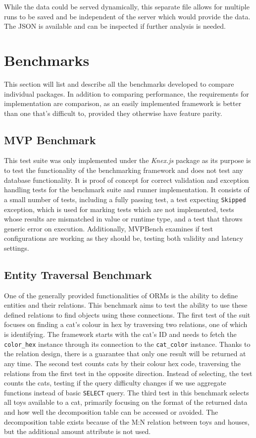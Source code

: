While the data could be served dynamically, this separate file allows for
multiple runs to be saved and be independent of the server which would provide
the data. The JSON is available and can be inspected if further analysis is
needed.

\section{Benchmarks}
This section will list and describe all the benchmarks developed to compare
individual packages. In addition to comparing performance, the requirements for
implementation are comparison, as an easily implemented framework is better than
one that's difficult to, provided they otherwise have feature parity.

\subsection*{MVP Benchmark}
This test suite was only implemented under the \textit{Knex.js} package as its
purpose is to test the functionality of the benchmarking framework and does not
test any database functionality. It is proof of concept for correct validation
and exception handling tests for the benchmark suite and runner implementation.
It consists of a small number of tests, including a fully passing test, a test
expecting \texttt{Skipped} exception, which is used for marking tests which are
not implemented, tests whose results are mismatched in value or runtime type,
and a test that throws generic error on execution. Additionally, MVPBench
examines if test configurations are working as they should be, testing both
validity and latency settings.

\subsection*{Entity Traversal Benchmark}
One of the generally provided functionalities of ORMs is the ability to define
entities and their relations. This benchmark aims to test the ability to use
these defined relations to find objects using these connections. The first test
of the suit focuses on finding a cat's colour in hex by traversing two
relations, one of which is identifying. The framework starts with the cat's ID
and needs to fetch the \texttt{color\_hex} instance through its connection to
the \texttt{cat\_color} instance. Thanks to the relation design, there is a
guarantee that only one result will be returned at any time. The second test
counts cats by their colour hex code, traversing the relations from the first
test in the opposite direction. Instead of selecting, the test counts the cats,
testing if the query difficulty changes if we use aggregate functions instead of
basic \texttt{SELECT} query. The third test in this benchmark selects all toys
available to a cat, primarily focusing on the format of the returned data and
how well the decomposition table can be accessed or avoided. The decomposition
table exists because of the M:N relation between toys and houses, but the
additional amount attribute is not used.

